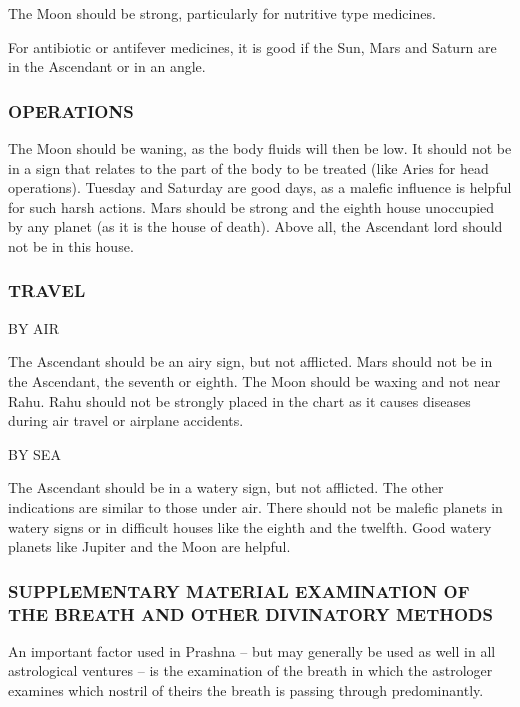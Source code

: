 The Moon should be strong, particularly for nutritive type medicines.

For antibiotic or antifever medicines, it is good if the Sun, Mars and Saturn are in the Ascendant or in an angle.

 

\subsubsection{OPERATIONS}

The Moon should be waning, as the body fluids will then be low. It should not be in a sign that relates to the part of the body to be treated (like Aries for head operations). Tuesday and Saturday are good days, as a malefic influence is helpful for such harsh actions. Mars should be strong and the eighth house unoccupied by any planet (as it is the house of death). Above all, the Ascendant lord should not be in this house.

 

\subsubsection{TRAVEL}

BY AIR

The Ascendant should be an airy sign, but not afflicted. Mars should not be in the Ascendant, the seventh or eighth. The Moon should be waxing and not near Rahu. Rahu should not be strongly placed in the chart as it causes diseases during air travel or airplane accidents.

 

BY SEA

The Ascendant should be in a watery sign, but not afflicted. The other indications are similar to those under air. There should not be malefic planets in watery signs or in difficult houses like the eighth and the twelfth. Good watery planets like Jupiter and the Moon are helpful.

 

\subsubsection{SUPPLEMENTARY MATERIAL
EXAMINATION OF THE BREATH AND OTHER DIVINATORY METHODS}
 

An important factor used in Prashna – but may generally be used as well in all astrological ventures – is the examination of the breath in which the astrologer examines which nostril of theirs the breath is passing through predominantly.

